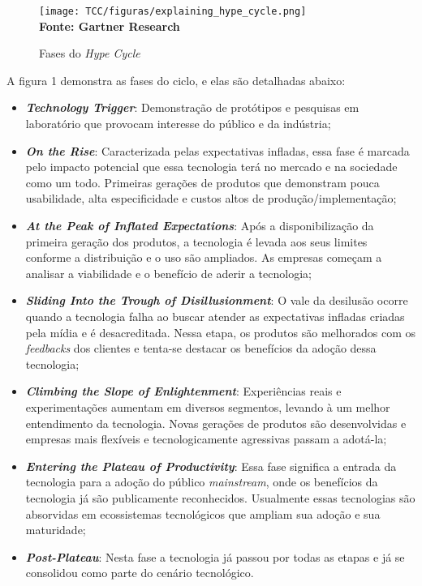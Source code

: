\begin{figure}[H]
	\centering	
	\caption[\hspace{0.1cm}Fases do \textit{Hype Cycle}]{Fases do \textit{Hype Cycle}}
	  \vspace{-0.4cm}
	\texttt{[image: TCC/figuras/explaining\_hype\_cycle.png]}
 	\captionsetup{justification=centering}
	 \vspace{-0.3cm}
	\\\textbf{\footnotesize Fonte: Gartner Research}
	\label{fig:tela1}
\end{figure}

A figura 1 demonstra as fases do ciclo, e elas são detalhadas abaixo:

\begin{itemize}
\item \textbf{\textit{Technology Trigger}}: Demonstração de protótipos e pesquisas em laboratório que provocam interesse do público e da indústria;
\item \textbf{\textit{On the Rise}}: Caracterizada pelas expectativas infladas, essa fase é marcada pelo impacto potencial que essa tecnologia terá no mercado e na sociedade como um todo. Primeiras gerações de produtos que demonstram pouca usabilidade, alta especificidade e custos altos de produção/implementação;
\item \textbf{\textit{At the Peak of Inflated Expectations}}: Após a disponibilização da primeira geração dos produtos, a tecnologia é levada aos seus limites conforme a distribuição e o uso são ampliados. As empresas começam a analisar a viabilidade e o benefício de aderir a tecnologia;
\item \textbf{\textit{Sliding Into the Trough of Disillusionment}}: O vale da desilusão ocorre quando a tecnologia falha ao buscar atender as expectativas infladas criadas pela mídia e é desacreditada. Nessa etapa, os produtos são melhorados com os \textit{feedbacks} dos clientes e tenta-se destacar os benefícios da adoção dessa tecnologia;
\item \textbf{\textit{Climbing the Slope of Enlightenment}}: Experiências reais e experimentações aumentam em diversos segmentos, levando à um melhor entendimento da tecnologia. Novas gerações de produtos são desenvolvidas e empresas mais flexíveis e tecnologicamente agressivas passam a adotá-la;
\item \textbf{\textit{Entering the Plateau of Productivity}}: Essa fase significa a entrada da tecnologia para a adoção do público \textit{mainstream}, onde os benefícios da tecnologia já são publicamente reconhecidos. Usualmente essas tecnologias são absorvidas em ecossistemas tecnológicos que ampliam sua adoção e sua maturidade; 
\item \textbf{\textit{Post-Plateau}}: Nesta fase a tecnologia já passou por todas as etapas e já se consolidou como parte do cenário tecnológico.
\end{itemize}

